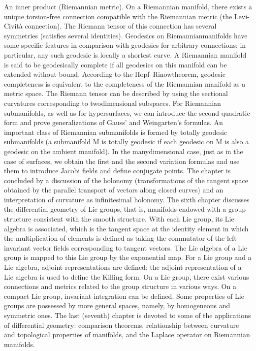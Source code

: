 \documentclass[a4paper,10pt]{article}
\begin{document}
An inner product (Riemannian metric). On a Riemannian manifold, there exists a
unique torsion-free connection compatible with the Riemannian metric (the Levi-
Cività connection). The Riemann tensor of this connection has several symmetries
(satisfies several identities). Geodesics on Riemannianmanifolds have some specific
features in comparison with geodesics for arbitrary connections; in particular, any
such geodesic is locally a shortest curve. A Riemannian manifold is said to be
geodesically complete if all geodesics on this manifold can be extended without
bound. According to the Hopf–Rinowtheorem, geodesic completeness is equivalent
to the completeness of the Riemannian manifold as a metric space. The Riemann
tensor can be described by using the sectional curvatures corresponding to twodimensional
subspaces. For Riemannian submanifolds, as well as for hypersurfaces,
we can introduce the second quadratic form and prove generalizations of Gauss’
and Weingarten’s formulas. An important class of Riemannian submanifolds is
formed by totally geodesic submanifolds (a submanifold M is totally geodesic if
each geodesic on M is also a geodesic on the ambient manifold). In the manydimensional
case, just as in the case of surfaces, we obtain the first and the second
variation formulas and use them to introduce Jacobi fields and define conjugate
points. The chapter is concluded by a discussion of the holonomy (transformations
of the tangent space obtained by the parallel transport of vectors along closed
curves) and an interpretation of curvature as infinitesimal holonomy.
The sixth chapter discusses the differential geometry of Lie groups, that is,
manifolds endowed with a group structure consistent with the smooth structure.
With each Lie group, its Lie algebra is associated, which is the tangent space at
the identity element in which the multiplication of elements is defined as taking the
commutator of the left-invariant vector fields corresponding to tangent vectors. The
Lie algebra of a Lie group is mapped to this Lie group by the exponential map.
For a Lie group and a Lie algebra, adjoint representations are defined; the adjoint
representation of a Lie algebra is used to define the Killing form. On a Lie group,
there exist various connections and metrics related to the group structure in various
ways. On a compact Lie group, invariant integration can be defined. Some properties
of Lie groups are possessed by more general spaces, namely, by homogeneous and
symmetric ones.
The last (seventh) chapter is devoted to some of the applications of differential
geometry: comparison theorems, relationship between curvature and topological
properties of manifolds, and the Laplace operator on Riemannian manifolds.
\end{document}
